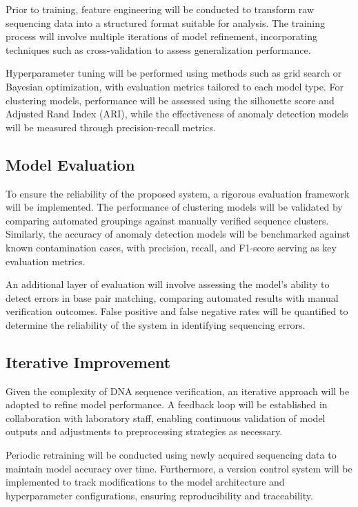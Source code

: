   Prior to training, feature engineering will be conducted to transform raw sequencing data into a structured format suitable for analysis. The training process will involve multiple iterations of model refinement, incorporating techniques such as cross-validation to assess generalization performance.
  
  Hyperparameter tuning will be performed using methods such as grid search or Bayesian optimization, with evaluation metrics tailored to each model type. For clustering models, performance will be assessed using the silhouette score and Adjusted Rand Index (ARI), while the effectiveness of anomaly detection models will be measured through precision-recall metrics.
  
  \subsection{Model Evaluation}
  To ensure the reliability of the proposed system, a rigorous evaluation framework will be implemented. The performance of clustering models will be validated by comparing automated groupings against manually verified sequence clusters. Similarly, the accuracy of anomaly detection models will be benchmarked against known contamination cases, with precision, recall, and F1-score serving as key evaluation metrics.
  
  An additional layer of evaluation will involve assessing the model’s ability to detect errors in base pair matching, comparing automated results with manual verification outcomes. False positive and false negative rates will be quantified to determine the reliability of the system in identifying sequencing errors.
  
  \subsection{Iterative Improvement}
  Given the complexity of DNA sequence verification, an iterative approach will be adopted to refine model performance. A feedback loop will be established in collaboration with laboratory staff, enabling continuous validation of model outputs and adjustments to preprocessing strategies as necessary.
  
  Periodic retraining will be conducted using newly acquired sequencing data to maintain model accuracy over time. Furthermore, a version control system will be implemented to track modifications to the model architecture and hyperparameter configurations, ensuring reproducibility and traceability.
  